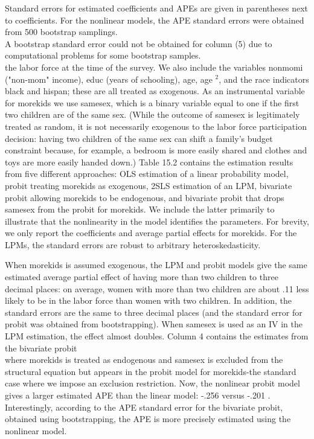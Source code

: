 \documentclass[10pt]{article}
\begin{document}
Standard errors for estimated coefficients and APEs are given in parentheses next to coefficients. For the nonlinear models, the APE standard errors were obtained from 500 bootstrap samplings.\\
A bootstrap standard error could not be obtained for column (5) due to computational problems for some bootstrap samples.\\
the labor force at the time of the survey. We also include the variables nonmomi ("non-mom" income), educ (years of schooling), age, age ${ }^{2}$, and the race indicators black and hispan; these are all treated as exogenous. As an instrumental variable for morekids we use samesex, which is a binary variable equal to one if the first two children are of the same sex. (While the outcome of samesex is legitimately treated as random, it is not necessarily exogenous to the labor force participation decision: having two children of the same sex can shift a family's budget constraint because, for example, a bedroom is more easily shared and clothes and toys are more easily handed down.) Table 15.2 contains the estimation results from five different approaches: OLS estimation of a linear probability model, probit treating morekids as exogenous, 2SLS estimation of an LPM, bivariate probit allowing morekids to be endogenous, and bivariate probit that drops samesex from the probit for morekids. We include the latter primarily to illustrate that the nonlinearity in the model identifies the parameters. For brevity, we only report the coefficients and average partial effects for morekids. For the LPMs, the standard errors are robust to arbitrary heteroskedasticity.

When morekids is assumed exogenous, the LPM and probit models give the same estimated average partial effect of having more than two children to three decimal places: on average, women with more than two children are about .11 less likely to be in the labor force than women with two children. In addition, the standard errors are the same to three decimal places (and the standard error for probit was obtained from bootstrapping). When samesex is used as an IV in the LPM estimation, the effect almost doubles. Column 4 contains the estimates from the bivariate probit\\
where morekids is treated as endogenous and samesex is excluded from the structural equation but appears in the probit model for morekids-the standard case where we impose an exclusion restriction. Now, the nonlinear probit model gives a larger estimated APE than the linear model: -.256 versus -.201 . Interestingly, according to the APE standard error for the bivariate probit, obtained using bootstrapping, the APE is more precisely estimated using the nonlinear model.
\end{document}
